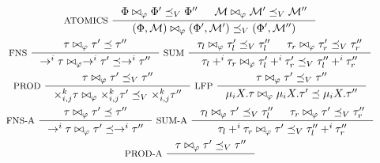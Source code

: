 \begin{figure}
  \centering
  \begin{gather*}
    \inference[ ATOMICS ]{
      \Phi \join{ \varphi } \Phi' \subtype_V \Phi'' &
      \mathcal{M} \join{ \varphi } \mathcal{M}' \subtype_V \mathcal{M}'' }{
      (\Phi, \mathcal{M}) \join{ \varphi } (\Phi', \mathcal{M}') \subtype_V %
      (\Phi', \mathcal{M}'') } \\
    \inference[ FNS ]{
      \tau \join{ \varphi } \tau' \subtype \tau'' }{
      \to^i \tau \join{ \varphi } \to^i \tau' \subtype \to^i \tau'' }
    \inference[ SUM ]{
      \tau_l \join{ \varphi } \tau_l' \subtype_V \tau_l'' &
      \tau_r \join{ \varphi } \tau_r' \subtype_V \tau_r'' }{
      \tau_l +^i \tau_r \join{ \varphi } \tau_l' +^i \tau_r' %
      \subtype_V \tau_l'' +^i \tau_r'' } \\
    \inference[ PROD ]{
      \tau \join{ \varphi } \tau' \subtype_V \tau'' }{
      \times_{i, j}^k \tau \join{ \varphi } %
      \times_{i, j}^k \tau' \subtype_V \times_{i, j}^k \tau'' }
    \inference[ LFP ]{
      \tau \join{ \varphi } \tau' \subtype_V \tau'' }{
      \mu_i X. \tau \join{ \varphi } \mu_i X. \tau' \subtype %
      \mu_i X. \tau'' } \\
    \inference[ FNS-A ]{
      \tau \join{ \varphi } \tau' \subtype \tau'' }{
      \to^i \tau \join{ \varphi } \tau' \subtype \to^i \tau'' }
    \inference[ SUM-A ]{
      \tau_l \join{ \varphi } \tau' \subtype_V \tau_l'' &
      \tau_r \join{ \varphi } \tau' \subtype_V \tau_r'' }{
      \tau_l +^i \tau_r \join{ \varphi } \tau' %
      \subtype_V \tau_l'' +^i \tau_r'' } \\
    \inference[ PROD-A ]{
      \tau \join{ \varphi } \tau' \subtype_V \tau'' }{
}
\end{gather*}
\end{figure}
